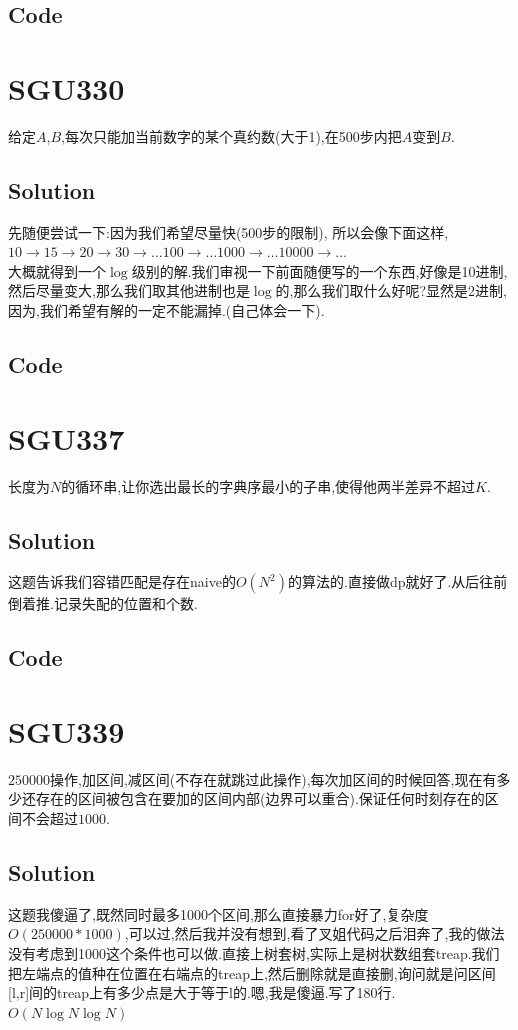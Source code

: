 \documentclass{article}
\newcommand{\includecode}[2][c]{}
\begin{document}
\begin{flushleft}
\subsection{Code}
\includecode[C++]{328.cc}

\section{SGU330}
给定$A$,$B$,每次只能加当前数字的某个真约数(大于1),在500步内把$A$变到$B$.
\subsection{Solution}
先随便尝试一下:因为我们希望尽量快(500步的限制), 所以会像下面这样, $10 \rightarrow 15 \rightarrow 20 \rightarrow 30 \rightarrow \dots 100 \rightarrow \dots 1000 \rightarrow \dots 10000 \rightarrow \dots$\\
大概就得到一个$\log$级别的解.我们审视一下前面随便写的一个东西,好像是10进制,然后尽量变大,那么我们取其他进制也是$\log$的,那么我们取什么好呢?显然是2进制,因为,我们希望有解的一定不能漏掉.(自己体会一下).
\subsection{Code}
\includecode[C++]{330.cc}

\section{SGU337}
长度为$N$的循环串,让你选出最长的字典序最小的子串,使得他两半差异不超过$K$.
\subsection{Solution}
这题告诉我们容错匹配是存在naive的$O(N^2)$的算法的.直接做dp就好了.从后往前倒着推.记录失配的位置和个数.
\subsection{Code}
\includecode[C++]{337.cc}

\section{SGU339}
$250000$操作,加区间,减区间(不存在就跳过此操作),每次加区间的时候回答,现在有多少还存在的区间被包含在要加的区间内部(边界可以重合).保证任何时刻存在的区间不会超过$1000$.

\subsection{Solution}
这题我傻逼了,既然同时最多1000个区间,那么直接暴力for好了,复杂度$O(250000 * 1000)$,可以过,然后我并没有想到,看了叉姐代码之后泪奔了,我的做法没有考虑到1000这个条件也可以做.直接上树套树,实际上是树状数组套treap.我们把左端点的值种在位置在右端点的treap上,然后删除就是直接删,询问就是问区间[l,r]间的treap上有多少点是大于等于l的.嗯,我是傻逼.写了180行.$O(N\log{N}\log{N})$

\end{flushleft}
\end{document}
